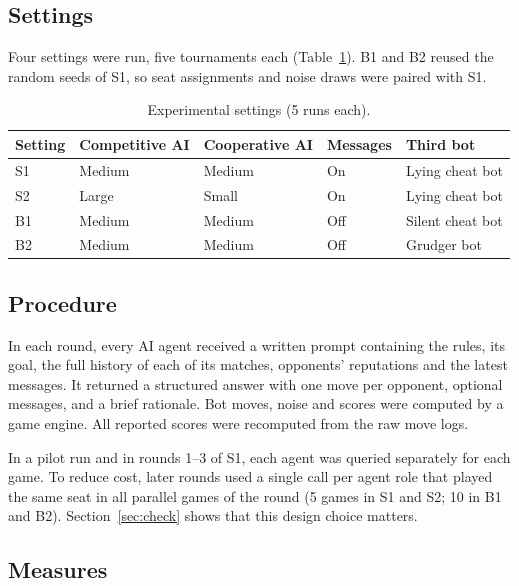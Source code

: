 \documentclass[11pt,a4paper]{article}
\begin{document}
\subsection{Settings}

Four settings were run, five tournaments each (Table~\ref{tab:settings}). B1 and B2 reused the random seeds of S1, so seat assignments and noise draws were paired with S1.

\begin{table}[htbp]
\centering
\caption{Experimental settings (5 runs each).}
\label{tab:settings}
\small
\begin{tabular}{@{}lllll@{}}
\toprule
Setting & Competitive AI & Cooperative AI & Messages & Third bot \\
\midrule
S1 & Medium & Medium & On  & Lying cheat bot \\
S2 & Large  & Small  & On  & Lying cheat bot \\
B1 & Medium & Medium & Off & Silent cheat bot \\
B2 & Medium & Medium & Off & Grudger bot \\
\bottomrule
\end{tabular}
\end{table}

\subsection{Procedure}

In each round, every AI agent received a written prompt containing the rules, its goal, the full history of each of its matches, opponents' reputations and the latest messages. It returned a structured answer with one move per opponent, optional messages, and a brief rationale. Bot moves, noise and scores were computed by a game engine. All reported scores were recomputed from the raw move logs.

In a pilot run and in rounds 1--3 of S1, each agent was queried separately for each game. To reduce cost, later rounds used a single call per agent role that played the same seat in all parallel games of the round (5 games in S1 and S2; 10 in B1 and B2). Section~\ref{sec:check} shows that this design choice matters.

\subsection{Measures}
\end{document}
